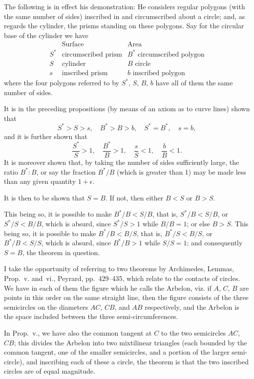 \documentclass[11pt,a4paper]{book}
\begin{document}
The following is in effect his demonstration: He considers regular polygons (with the same number of sides) inscribed in and circumscribed about a circle; and, as regards the cylinder, the prisms standing on these polygons. Say for the circular base of the cylinder we have
\[
\begin{array}{c|c|c}
& \text{Surface} & \text{Area} \\ \hline
S^* & \text{circumscribed prism} & B^* \text{ circumscribed polygon} \\
S & \text{cylinder} & B \text{ circle} \\
s & \text{inscribed prism} & b \text{ inscribed polygon}
\end{array}
\]
where the four polygons referred to by $S^*$, $S$, $B$, $b$ have all of them the same number of sides.

It is in the preceding propositions (by means of an axiom as to curve lines) shown that
\[
S^* > S > s, \quad B^* > B > b, \quad S^* = B^*, \quad s = b,
\]
and it is further shown that
\[
\frac{S^*}{S} > 1, \quad \frac{B^*}{B} > 1, \quad \frac{s}{S} < 1, \quad \frac{b}{B} < 1.
\]
It is moreover shown that, by taking the number of sides sufficiently large, the ratio $B^* : B$, or say the fraction $B^*/B$ (which is greater than 1) may be made less than any given quantity $1 + \epsilon$.

It is then to be shown that $S = B$. If not, then either $B < S$ or $B > S$.

This being so, it is possible to make $B^*/B < S/B$, that is, $S^*/B < S/B$, or $S^*/S < B/B$, which is absurd, since $S^*/S > 1$ while $B/B = 1$; or else $B > S$. This being so, it is possible to make $B^*/B < B/S$, that is, $B^*/S < B/S$, or $B^*/B < S/S$, which is absurd, since $B^*/B > 1$ while $S/S = 1$; and consequently $S = B$, the theorem in question.

I take the opportunity of referring to two theorems by Archimedes, Lemmas, Prop.~v. and~vi., Peyrard, pp.~429--435, which relate to the contacts of circles. We have in each of them the figure which he calls the Arbelon, viz. if $A$, $C$, $B$ are points in this order on the same straight line, then the figure consists of the three semicircles on the diameters $AC$, $CB$, and $AB$ respectively, and the Arbelon is the space included between the three semi-circumferences.

In Prop.~v., we have also the common tangent at $C$ to the two semicircles $AC$, $CB$; this divides the Arbelon into two mixtilinear triangles (each bounded by the common tangent, one of the smaller semicircles, and a portion of the larger semi-circle), and inscribing each of these a circle, the theorem is that the two inscribed circles are of equal magnitude.
\end{document}
